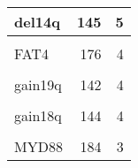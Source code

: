\documentclass[11pt, a4paper, twosided]{book}
\begin{document}
\begin{table}
\begin{tabular}{l|r|r}
\hline
del14q & 145 & 5\\
\hline
\cellcolor[HTML]{E2E868}{IKZF3} & \cellcolor[HTML]{E2E868}{176} & \cellcolor[HTML]{E2E868}{4}\\
\hline
FAT4 & 176 & 4\\
\hline
\cellcolor[HTML]{E2E868}{EGR2} & \cellcolor[HTML]{E2E868}{176} & \cellcolor[HTML]{E2E868}{4}\\
\hline
gain19q & 142 & 4\\
\hline
\cellcolor[HTML]{E2E868}{gain19p} & \cellcolor[HTML]{E2E868}{142} & \cellcolor[HTML]{E2E868}{4}\\
\hline
gain18q & 144 & 4\\
\hline
\cellcolor[HTML]{E2E868}{del9q} & \cellcolor[HTML]{E2E868}{142} & \cellcolor[HTML]{E2E868}{4}\\
\hline
MYD88 & 184 & 3\\
\hline
\end{tabular}
\end{table}
\end{document}
